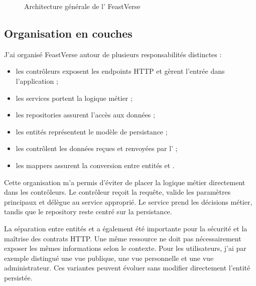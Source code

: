\begin{figure}[H]
\centering
{}
\caption{Architecture générale de l' FeastVerse}
\label{fig:architecture-feastverse}
\end{figure}

\subsection{Organisation en couches}

J'ai organisé FeastVerse autour de plusieurs responsabilités distinctes :

\begin{itemize}
    \item les contrôleurs exposent les endpoints HTTP et gèrent l'entrée dans l'application ;
    \item les services portent la logique métier ;
    \item les repositories assurent l'accès aux données ;
    \item les entités représentent le modèle de persistance ;
    \item les  contrôlent les données reçues et renvoyées par l' ;
    \item les mappers assurent la conversion entre entités et .
\end{itemize}

Cette organisation m'a permis d'éviter de placer la logique métier directement dans les contrôleurs. Le contrôleur reçoit la requête, valide les paramètres principaux et délègue au service approprié. Le service prend les décisions métier, tandis que le repository reste centré sur la persistance.

La séparation entre entités et  a également été importante pour la sécurité et la maîtrise des contrats HTTP. Une même ressource ne doit pas nécessairement exposer les mêmes informations selon le contexte. Pour les utilisateurs, j'ai par exemple distingué une vue publique, une vue personnelle et une vue administrateur. Ces variantes peuvent évoluer sans modifier directement l'entité persistée.

